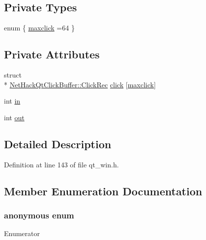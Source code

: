 \subsection*{Private Types}
\begin{DoxyCompactItemize}
\item 
enum \{ \hyperlink{classNetHackQtClickBuffer_a00435f4c541543c6794f86b8bc1253d7aa3d0e8b0228195d1424a18cd3753ba60}{maxclick} =64
 \}
\end{DoxyCompactItemize}
\subsection*{Private Attributes}
\begin{DoxyCompactItemize}
\item 
struct \\*
\hyperlink{structNetHackQtClickBuffer_1_1ClickRec}{Net\+Hack\+Qt\+Click\+Buffer\+::\+Click\+Rec} \hyperlink{classNetHackQtClickBuffer_a8d903805513acd57c5ca97ce283cf8ff}{click} \mbox{[}\hyperlink{classNetHackQtClickBuffer_a00435f4c541543c6794f86b8bc1253d7aa3d0e8b0228195d1424a18cd3753ba60}{maxclick}\mbox{]}
\item 
int \hyperlink{classNetHackQtClickBuffer_a61ba4171499a295cc037983815bb6552}{in}
\item 
int \hyperlink{classNetHackQtClickBuffer_a609a875071b98553ccb3fa3126dd8244}{out}
\end{DoxyCompactItemize}


\subsection{Detailed Description}


Definition at line 143 of file qt\+\_\+win.\+h.



\subsection{Member Enumeration Documentation}
\hypertarget{classNetHackQtClickBuffer_a00435f4c541543c6794f86b8bc1253d7}{\subsubsection[{anonymous enum}]{\setlength{\rightskip}{0pt plus 5cm}anonymous enum\hspace{0.3cm}{\ttfamily [private]}}}\label{classNetHackQtClickBuffer_a00435f4c541543c6794f86b8bc1253d7}
\begin{Desc}
\item[Enumerator]\par
\begin{description}
\item[{\em 
\hypertarget{classNetHackQtClickBuffer_a00435f4c541543c6794f86b8bc1253d7aa3d0e8b0228195d1424a18cd3753ba60}{maxclick}\label{classNetHackQtClickBuffer_a00435f4c541543c6794f86b8bc1253d7aa3d0e8b0228195d1424a18cd3753ba60}
}]\end{description}
\end{Desc}


